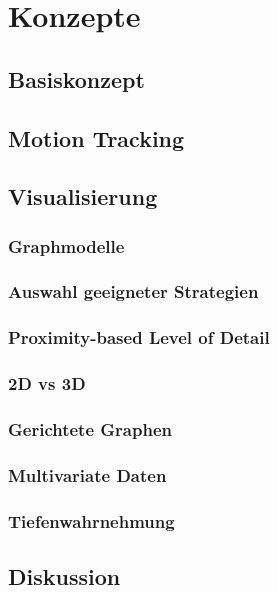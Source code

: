 %
\chapter{Konzepte}
\label{sec:concepts}


\Blindtext[2][1]

\section{Basiskonzept}
\label{sec:concepts:base}

\Blindtext[2][2]

\section{Motion Tracking}
\label{sec:concepts:motion}

\Blindtext[3][2]

\section{Visualisierung}
\label{sec:concepts:sec3}

\Blindtext[4][2]
\subsection{Graphmodelle}
\subsection{Auswahl geeigneter Strategien}
\subsection{Proximity-based Level of Detail}
\subsection{2D vs 3D}
\subsection{Gerichtete Graphen}
\subsection{Multivariate Daten}
\subsection{Tiefenwahrnehmung}

\section{Diskussion}

\label{sec:concepts:discussion}

\Blindtext[2][1]
